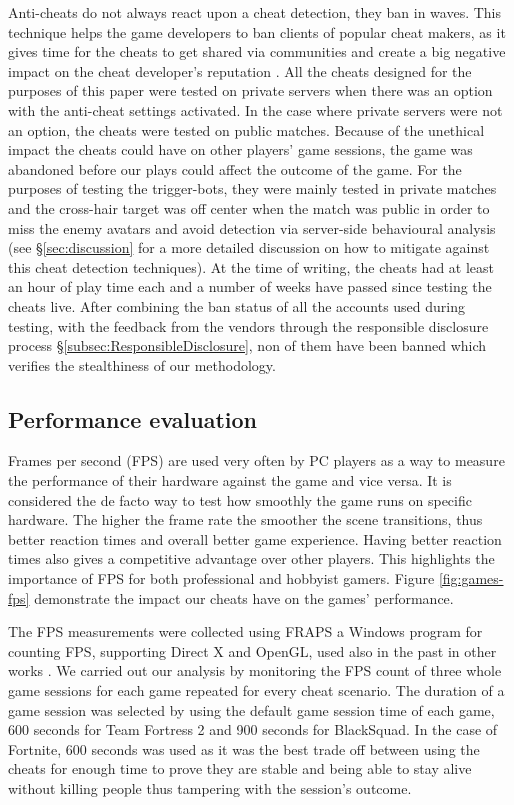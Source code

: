 Anti-cheats do not always react upon a cheat detection, they ban in waves. This technique helps the game developers to ban clients of popular cheat makers, as it gives time for the cheats to get shared via communities and create a big negative impact on the cheat developer's reputation \cite{ricochetWaves}. All the cheats designed for the purposes of this paper were tested on private servers when there was an option with the anti-cheat settings activated. In the case where private servers were not an option, the cheats were tested on public matches. Because of the unethical impact the cheats could have on other players' game sessions, the game was abandoned before our plays could affect the outcome of the game. For the purposes of testing the trigger-bots, they were mainly tested in private matches and the cross-hair target was off center when the match was public in order to miss the enemy avatars and avoid detection via server-side behavioural analysis (see \S\ref{sec:discussion} for a more detailed discussion on how to mitigate against this cheat detection techniques). At the time of writing, the cheats had at least an hour of play time each and a number of weeks have passed since testing the cheats live. After combining the ban status of all the accounts used during testing, with the feedback from the vendors through the responsible disclosure process \S\ref{subsec:ResponsibleDisclosure}, non of them have been banned which verifies the stealthiness of our methodology.



\subsection{Performance evaluation}
Frames per second (FPS) are used very often by PC players as a way to measure the performance of their hardware against the game and vice versa. It is considered the de facto way to test how smoothly the game runs on specific hardware. The higher the frame rate the smoother the scene transitions, thus better reaction times and overall better game experience. Having better reaction times also gives a competitive advantage over other players. This highlights the importance of FPS for both professional and hobbyist gamers. Figure \ref{fig:games-fps} demonstrate the impact our cheats have on the games' performance.

The FPS measurements were collected using FRAPS \cite{fraps} a Windows program for counting FPS, supporting Direct X and OpenGL, used also in the past in other works \cite{fraps::xueffects,fraps::abeysundaraperformance}. We carried out our analysis by monitoring the FPS count of three whole game sessions for each game repeated for every cheat scenario. The duration of a game session was selected by using the default game session time of each game, 600 seconds for Team Fortress 2 and 900 seconds for BlackSquad. In the case of Fortnite, 600 seconds was used as it was the best trade off between using the cheats for enough time to prove they are stable and being able to stay alive without killing people thus tampering with the session's outcome.

